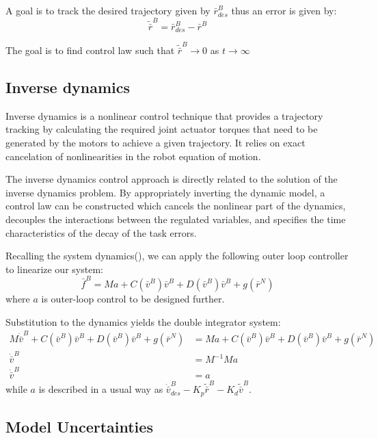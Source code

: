 A goal is to track the desired trajectory given by ${\bar r}_{des}^B$ thus an error is given by:
$$
    {\tilde{\bar r}}^B = {\bar r}_{des}^B - {\bar r}^B
$$

The goal is to find control law such that ${\tilde{\bar r}}^B\rightarrow 0 $ as $t\rightarrow \infty$

\subsection{Inverse dynamics}

Inverse dynamics is a nonlinear control technique that provides a trajectory tracking
by calculating the required joint actuator torques that need to be generated by the motors
to achieve a given trajectory. It relies on exact cancelation of nonlinearities in
the robot equation of motion.

The inverse dynamics control approach is directly related to the solution of the inverse
dynamics problem. By appropriately inverting the dynamic model, a control law can be 
constructed which cancels the nonlinear part of the dynamics, decouples the interactions 
between the regulated variables, and specifies the time characteristics of the decay of the 
task errors.

Recalling the system dynamics(), we can apply the following outer loop controller to 
linearize our system:
$$
    \bar{f}^B = M {a} +
    C(\bar{v}^B)\bar{v}^B +
    D(\bar{v}^B)\bar{v}^B +
    g(\bar{r}^N)
$$
where ${a}$ is outer-loop control to be designed further.

Substitution to the dynamics yields the double integrator system:
\begin{align*}
    M \dot{\bar{v}}^B + 
    C(\bar{v}^B) \bar{v}^B + 
    D(\bar{v}^B) \bar{v}^B + 
    g(\bar{r}^N) &= M {a} +
    C(\bar{v}^B)\bar{v}^B +
    D(\bar{v}^B)\bar{v}^B +
    g(\bar{r}^N) \\
    \dot{\bar{v}}^B &= M^{-1}M {a}\\
    \dot{\bar{v}}^B &= a
\end{align*}
while $a$ is described in a usual way as
$\dot{\bar{v}}^B_{des} - K_p \tilde{{\bar{r}}}^B - K_d \tilde{{\bar{v}}}^B$.

\subsection{Model Uncertainties}


